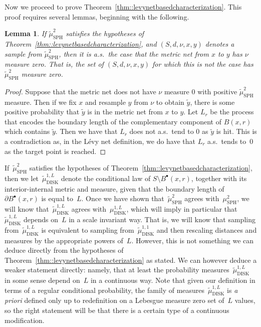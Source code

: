 \documentclass[10pt]{amsart}
\newcommand{\sbullet}{{\scriptscriptstyle\bullet}}
\theoremstyle{plain}
\numberwithin{theorem}{section}
\newtheorem{lemma}[theorem]{Lemma}
\theoremstyle{definition}
\newcommand{\mustwo}{\mu_{\mathrm{SPH}}^2}
\newcommand{\mudonel}{\mu_{ \mathrm{DISK}}^{1, L}}
\newcommand{\tmustwo}{\wt{\mu}_{\mathrm{SPH}}^2}
\newcommand{\tmudonel}{\wt{\mu}_{ \mathrm{DISK}}^{1, L}}
\def\tmudonelset#1{\wt{\mu}_{ \mathrm{DISK}}^{1, #1}}
\let\wt\widetilde
\newcommand{\fb}[2]{B^\sbullet(#1,#2)}
\begin{document}
Now we proceed to prove Theorem~\ref{thm::levynetbasedcharacterization}. This proof requires several lemmas, beginning with the following.

\begin{lemma}
\label{lem::metricnetmeasurezero}
If $\tmustwo$ satisfies the hypotheses of Theorem~\ref{thm::levynetbasedcharacterization}, and $(S,d,\nu,x,y)$ denotes a sample from $\tmustwo$, then it is a.s.\ the case that the metric net from $x$ to $y$ has $\nu$ measure zero. That is, the set of $(S,d,\nu,x,y)$ for which this is not the case has $\tmustwo$ measure zero.
\end{lemma}
\begin{proof}
Suppose that the metric net does not have $\nu$ measure $0$ with positive $\tmustwo$ measure. Then if we fix $x$ and resample $y$ from $\nu$ to obtain $\wt{y}$, there is some positive probability that $\wt{y}$ is in the metric net from $x$ to $y$. Let $L_r$ be the process that encodes the boundary length of the complementary component of $B(x,r)$ which contains $\wt{y}$. Then we have that $L_r$ does not a.s.\ tend to $0$ as $\wt{y}$ is hit. This is a contradiction as, in the Lévy net definition, we do have that $L_r$ a.s.\ tends to~$0$ as the target point is reached.
\end{proof}

If~$\tmustwo$ satisfies the hypotheses of Theorem~\ref{thm::levynetbasedcharacterization}, then we let~$\tmudonel$ denote the conditional law of $S \setminus \fb{x}{r}$, together with its interior-internal metric and measure, given that the boundary length of~$\partial \fb{x}{r}$ is equal to~$L$. Once we have shown that~$\tmustwo$ agrees with~$\mustwo$, we will know that~$\tmudonel$ agrees with~$\mudonel$, which will imply in particular that~$\tmudonel$ depends on~$L$ in a scale invariant way. That is, we will know that sampling from~$\tmudonel$ is equivalent to sampling from~$\tmudonelset{1}$ and then rescaling distances and measures by the appropriate powers of~$L$. However, this is not something we can deduce directly from the hypotheses of Theorem~\ref{thm::levynetbasedcharacterization} as stated. We can however deduce a weaker statement directly: namely, that at least the probability measures~$\tmudonel$ in some sense depend on~$L$ in a continuous way. Note that given our definition in terms of a regular conditional probability, the family of measures~$\tmudonel$ is \emph{a priori} defined only up to redefinition on a Lebesgue measure zero set of~$L$ values, so the right statement will be that there is a certain type of a continuous modification.
\end{document}
